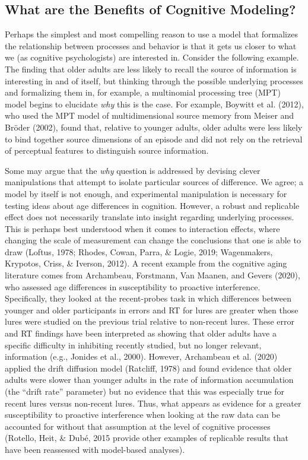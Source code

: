 \documentclass[
  english,
  ,man,floatsintext]{apa6}
\begin{document}
\hypertarget{what-are-the-benefits-of-cognitive-modeling}{%
\subsection{What are the Benefits of Cognitive Modeling?}\label{what-are-the-benefits-of-cognitive-modeling}}

Perhaps the simplest and most compelling reason to use a model that formalizes the relationship between processes and behavior is that it gets us closer to what we (as cognitive psychologists) are interested in. Consider the following example. The finding that older adults are less likely to recall the source of information is interesting in and of itself, but thinking through the possible underlying processes and formalizing them in, for example, a multinomial processing tree (MPT) model begins to elucidate \emph{why} this is the case. For example, Boywitt et al. (2012), who used the MPT model of multidimensional source memory from Meiser and Bröder (2002), found that, relative to younger adults, older adults were less likely to bind together source dimensions of an episode and did not rely on the retrieval of perceptual features to distinguish source information.

Some may argue that the \emph{why} question is addressed by devising clever manipulations that attempt to isolate particular sources of difference. We agree; a model by itself is not enough, and experimental manipulation is necessary for testing ideas about age differences in cognition. However, a robust and replicable effect does not necessarily translate into insight regarding underlying processes. This is perhaps best understood when it comes to interaction effects, where changing the scale of measurement can change the conclusions that one is able to draw (Loftus, 1978; Rhodes, Cowan, Parra, \& Logie, 2019; Wagenmakers, Krypotos, Criss, \& Iverson, 2012). A recent example from the cognitive aging literature comes from Archambeau, Forstmann, Van Maanen, and Gevers (2020), who assessed age differences in susceptibility to proactive interference. Specifically, they looked at the recent-probes task in which differences between younger and older participants in errors and RT for lures are greater when those lures were studied on the previous trial relative to non-recent lures. These error and RT findings have been interpreted as showing that older adults have a specific difficulty in inhibiting recently studied, but no longer relevant, information (e.g., Jonides et al., 2000). However, Archambeau et al. (2020) applied the drift diffusion model (Ratcliff, 1978) and found evidence that older adults were slower than younger adults in the rate of information accumulation (the \enquote{drift rate} parameter) but no evidence that this was especially true for recent lures versus non-recent lures. Thus, what appears as evidence for a greater susceptibility to proactive interference when looking at the raw data can be accounted for without that assumption at the level of cognitive processes (Rotello, Heit, \& Dubé, 2015 provide other examples of replicable results that have been reassessed with model-based analyses).
\end{document}
